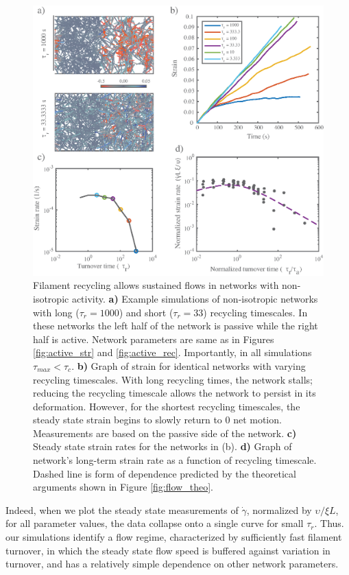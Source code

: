 \documentclass[10pt,letterpaper]{article}
\begin{document}
\begin{figure}[h!]
	\centering
	\includegraphics[width=\hsize]{figures/figure9}
	\caption{\label{fig:flow_ex}  Filament recycling allows sustained flows in networks with non-isotropic activity. \textbf{a)} Example simulations of non-isotropic networks with long ($\tau_r=1000$) and short ($\tau_r=33$) recycling timescales. In these networks the left half of the network is passive while the right half is active.  Network parameters are same as in Figures \ref{fig:active_str} and \ref{fig:active_rec}. Importantly, in all simulations $\tau_{max}<\tau_c$. \textbf{b)} Graph of strain for identical networks with varying recycling timescales.  With long recycling times, the network stalls; reducing the recycling timescale allows the network to persist in its deformation.  However, for the shortest recycling timescales, the steady state strain begins to slowly return to 0 net motion.  Measurements are based on the passive side of the network. \textbf{c)} Steady state strain rates for the networks in (b).     \textbf{d)} Graph of network's long-term strain rate as a function of recycling timescale. Dashed line is form of dependence predicted by the  theoretical arguments shown in Figure \ref{fig:flow_theo}.}
\end{figure}

Indeed, when we plot the steady state measurements of $\dot{\gamma}$, normalized by $\upsilon/\xi L$,  for all parameter values, the data collapse onto a single curve for small $\tau_r$.  Thus. our simulations identify a flow regime, characterized by sufficiently fast filament turnover, in which the steady state flow speed is buffered against variation in turnover, and has a relatively simple dependence on other network parameters.
\end{document}
